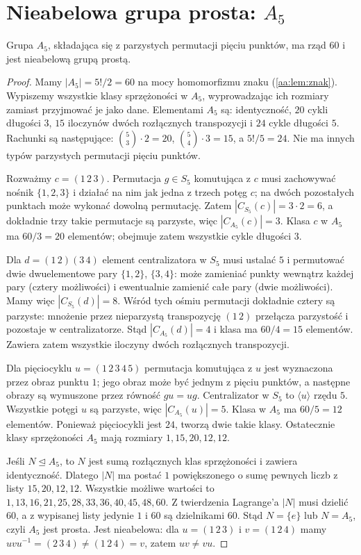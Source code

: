 \section{Nieabelowa grupa prosta: \texorpdfstring{$A_5$}{A5}}
\begin{twierdzenie}
\label{aa:tw:a5-simple}
Grupa $A_5$, składająca się z parzystych permutacji pięciu punktów,
ma rząd $60$ i jest nieabelową grupą prostą.
\end{twierdzenie}
\begin{proof}
Mamy $|A_5|=5!/2=60$ na mocy homomorfizmu znaku
(\ref{aa:lem:znak}). Wypiszemy wszystkie klasy sprzężoności
w $A_5$, wyprowadzając ich rozmiary zamiast przyjmować je jako dane.
Elementami $A_5$ są: identyczność, $20$ cykli długości $3$,
$15$ iloczynów dwóch rozłącznych transpozycji i $24$ cykle długości $5$.
Rachunki są następujące: $\binom53\cdot2=20$,
$\binom54\cdot3=15$, a $5!/5=24$.
Nie ma innych typów parzystych permutacji pięciu punktów.

Rozważmy $c=(1\,2\,3)$. Permutacja $g\in S_5$ komutująca
z $c$ musi zachowywać nośnik $\{1,2,3\}$ i działać na nim
jak jedna z trzech potęg $c$; na dwóch pozostałych punktach
może wykonać dowolną permutację. Zatem $|C_{S_5}(c)|=3\cdot2=6$,
a dokładnie trzy takie permutacje są parzyste,
więc $|C_{A_5}(c)|=3$. Klasa $c$ w $A_5$ ma $60/3=20$
elementów; obejmuje zatem wszystkie cykle długości $3$.

Dla $d=(1\,2)(3\,4)$ element centralizatora w $S_5$
musi ustalać $5$ i permutować dwie dwuelementowe pary
$\{1,2\}$, $\{3,4\}$: może zamieniać punkty wewnątrz każdej
pary (cztery możliwości) i ewentualnie zamienić całe pary
(dwie możliwości). Mamy więc $|C_{S_5}(d)|=8$.
Wśród tych ośmiu permutacji dokładnie cztery są parzyste:
mnożenie przez nieparzystą transpozycję $(1\,2)$
przełącza parzystość i pozostaje w centralizatorze.
Stąd $|C_{A_5}(d)|=4$ i klasa ma $60/4=15$ elementów.
Zawiera zatem wszystkie iloczyny dwóch rozłącznych transpozycji.

Dla pięciocyklu $u=(1\,2\,3\,4\,5)$ permutacja komutująca
z $u$ jest wyznaczona przez obraz punktu $1$;
jego obraz może być jednym z pięciu punktów, a następne obrazy
są wymuszone przez równość $gu=ug$.
Centralizator w $S_5$ to $\langle u\rangle$ rzędu $5$.
Wszystkie potęgi $u$ są parzyste, więc
$|C_{A_5}(u)|=5$. Klasa w $A_5$ ma $60/5=12$ elementów.
Ponieważ pięciocykli jest $24$, tworzą dwie takie klasy.
Ostatecznie klasy sprzężoności $A_5$ mają rozmiary
$1,15,20,12,12$.

Jeśli $N\trianglelefteq A_5$, to $N$ jest sumą rozłącznych
klas sprzężoności i zawiera identyczność. Dlatego $|N|$
ma postać $1$ powiększonego o sumę pewnych liczb z listy
$15,20,12,12$. Wszystkie możliwe wartości to
$1,13,16,21,25,28,33,36,40,45,48,60$.
Z twierdzenia Lagrange'a $|N|$ musi dzielić $60$,
a z wypisanej listy jedynie $1$ i $60$ są dzielnikami $60$.
Stąd $N=\{e\}$ lub $N=A_5$, czyli $A_5$ jest prosta.
Jest nieabelowa: dla $u=(1\,2\,3)$ i $v=(1\,2\,4)$
mamy $uvu^{-1}=(2\,3\,4)\ne(1\,2\,4)=v$,
zatem $uv\ne vu$.
\end{proof}

